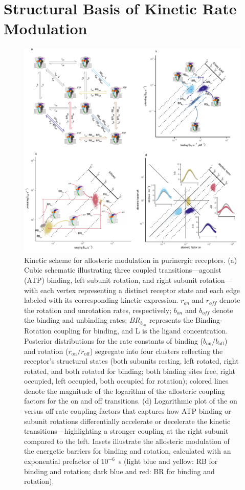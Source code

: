 \documentclass[pdflatex,sn-nature]{sn-jnl}%
\theoremstyle{thmstyleone}%
\theoremstyle{thmstyletwo}%
\theoremstyle{thmstylethree}%
\begin{document}
\section{Structural Basis of Kinetic Rate Modulation}
\begin{figure}[!htbp]
	\centering
	\includegraphics[width=\linewidth]{Figure_3_scheme_10.pdf}
	\caption{Kinetic scheme for allosteric modulation in purinergic receptors. (a) Cubic schematic illustrating three coupled transitions---agonist (ATP) binding, left subunit rotation, and right subunit rotation---with each vertex representing a distinct receptor state and each edge labeled with its corresponding kinetic expression. $r_{on}$ and $r_{off}$ denote the rotation and unrotation rates, respectively; $b_{on}$ and $b_{off}$ denote the binding and unbinding rates; $BR_{b_{on}}$ represents the Binding-Rotation coupling for binding, and L is the ligand concentration. Posterior distributions for the rate constants of binding ($b_{\text{on}}/b_{\text{off}}$) and rotation ($r_{\text{on}}/r_{\text{off}}$) segregate into four clusters reflecting the receptor's structural states (both subunits resting, left rotated, right rotated, and both rotated for binding; both binding sites free, right occupied, left occupied, both occupied for rotation); colored lines denote the magnitude of the logarithm of the allosteric coupling factors for the on and off transitions. (d) Logarithmic plot of the on versus off rate coupling factors that captures how ATP binding or subunit rotations differentially accelerate or decelerate the kinetic transitions---highlighting a stronger coupling at the right subunit compared to the left. Insets illustrate the allosteric modulation of the energetic barriers for binding and rotation, calculated with an exponential prefactor of $10^{-6}$~s (light blue and yellow: RB for binding and rotation; dark blue and red: BR for binding and rotation).}
	\label{fig:rates_SchemeX}
\end{figure}
\end{document}
